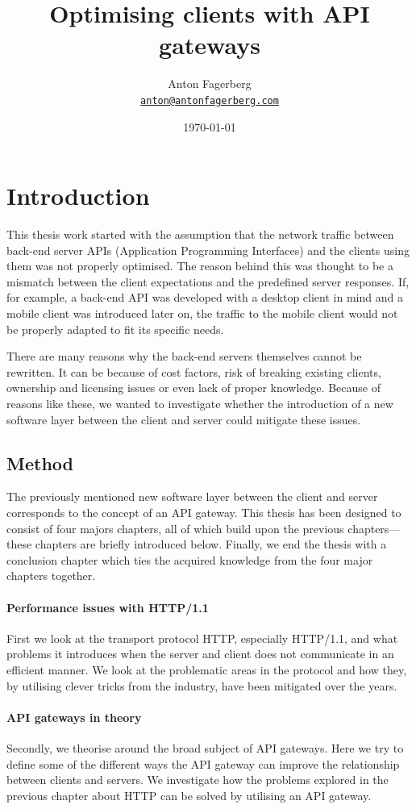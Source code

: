 \documentclass{cslthse-msc}
\author{
	Anton Fagerberg \\
	{\normalsize \href{mailto:anton@antonfagerberg.com}{\texttt{anton@antonfagerberg.com}}}
}
\title{Optimising clients with API gateways}
\subtitle{}
\date{\today}
\begin{document}
\makefrontmatter

\chapter{Introduction}
This thesis work started with the assumption that the network traffic between back-end server APIs (Application Programming Interfaces) and the clients using them was not properly optimised. The reason behind this was thought to be a mismatch between the client expectations and the predefined server responses. If, for example, a back-end API was developed with a desktop client in mind and a mobile client was introduced later on, the traffic to the mobile client would not be properly adapted to fit its specific needs.

There are many reasons why the back-end servers themselves cannot be rewritten. It can be because of cost factors, risk of breaking existing clients, ownership and licensing issues or even lack of proper knowledge. Because of reasons like these, we wanted to investigate whether the introduction of a new software layer between the client and server could mitigate these issues.

\section{Method}

The previously mentioned new software layer between the client and server corresponds to the concept of an API gateway. This thesis has been designed to consist of four majors chapters, all of which build upon the previous chapters---these chapters are briefly introduced below. Finally, we end the thesis with a conclusion chapter which ties the acquired knowledge from the four major chapters together.

\subsubsection{Performance issues with HTTP/1.1}
First we look at the transport protocol HTTP, especially HTTP/1.1, and what problems it introduces when the server and client does not communicate in an efficient manner. We look at the problematic areas in the protocol and how they, by utilising clever tricks from the industry, have been mitigated over the years.

\subsubsection{API gateways in theory}
Secondly, we theorise around the broad subject of API gateways. Here we try to define some of the different ways the API gateway can improve the relationship between clients and servers. We investigate how the problems explored in the previous chapter about HTTP can be solved by utilising an API gateway.
\end{document}
